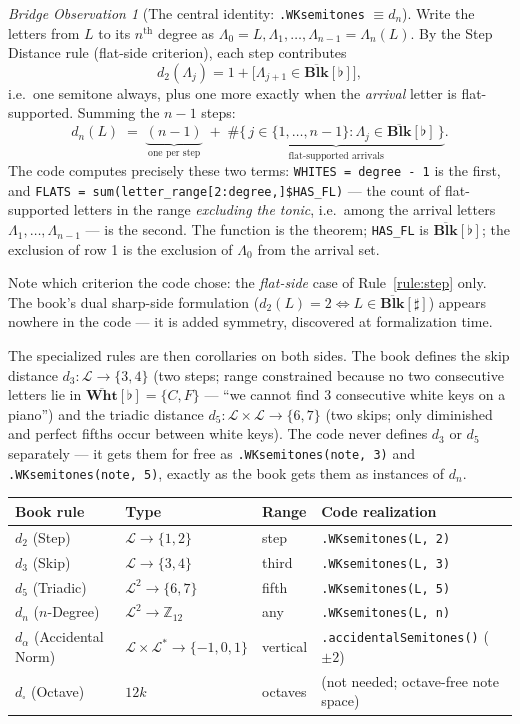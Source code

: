\documentclass[11pt]{article}
\newcommand{\MAlph}{\mathcal{L}}                 %
\newcommand{\Lstar}{\MAlph^{*}}                  %
\newcommand{\Lam}{\Lambda}                      %
\newcommand{\BL}{\overline{\textbf{Blk}}}       %
\newcommand{\WH}{\overline{\textbf{Wht}}}       %
\newcommand{\Ztwelve}{\mathbb{Z}_{12}}
\theoremstyle{definition}
\theoremstyle{remark}
\newtheorem{bridge}{Bridge Observation}[section]
\newcommand{\code}[1]{\texttt{#1}}
\begin{document}
\begin{bridge}[The central identity: \code{.WKsemitones} $\equiv d_n$]
\label{obs:central}
Write the letters from $L$ to its $n^{\text{th}}$ degree as
$\Lam_0 = L, \Lam_1, \dots, \Lam_{n-1} = \Lam_n(L)$. By the Step Distance rule
(flat-side criterion), each step contributes
$$d_2(\Lam_j) = 1 + \big[\Lam_{j+1} \in \BL[\flat]\big],$$
i.e.\ one semitone always, plus one more exactly when the \emph{arrival} letter
is flat-supported. Summing the $n-1$ steps:
$$d_n(L) \;=\; \underbrace{(n-1)}_{\text{one per step}}
\;+\; \underbrace{\#\{\, j \in \{1,\dots,n-1\} : \Lam_j \in \BL[\flat] \,\}}_{\text{flat-supported arrivals}}.$$
The code computes precisely these two terms:
\code{WHITES = degree - 1} is the first, and
\code{FLATS = sum(letter\_range[2:degree,]\$HAS\_FL)} --- the count of
flat-supported letters in the range \emph{excluding the tonic}, i.e.\ among the
arrival letters $\Lam_1, \dots, \Lam_{n-1}$ --- is the second. The function is
the theorem; \code{HAS\_FL} is $\BL[\flat]$; the exclusion of row 1 is the
exclusion of $\Lam_0$ from the arrival set.

Note which criterion the code chose: the \emph{flat-side} case of
Rule~\ref{rule:step} only. The book's dual sharp-side formulation
($d_2(L) = 2 \iff L \in \BL[\sharp]$) appears nowhere in the code --- it is
added symmetry, discovered at formalization time.
\end{bridge}

The specialized rules are then corollaries on both sides. The book defines the
skip distance $d_3 : \MAlph \to \{3, 4\}$ (two steps; range constrained because
no two consecutive letters lie in $\WH[\flat] = \{C, F\}$ --- ``we cannot find 3
consecutive white keys on a piano'') and the triadic distance
$d_5 : \MAlph \times \MAlph \to \{6, 7\}$ (two skips; only diminished and perfect
fifths occur between white keys). The code never defines $d_3$ or $d_5$
separately --- it gets them for free as \code{.WKsemitones(note, 3)} and
\code{.WKsemitones(note, 5)}, exactly as the book gets them as instances of
$d_n$.

\begin{center}
\renewcommand{\arraystretch}{1.3}
\begin{tabular}{@{}llll@{}}
\toprule
\textbf{Book rule} & \textbf{Type} & \textbf{Range} & \textbf{Code realization} \\
\midrule
$d_2$ (Step) & $\MAlph \to \{1,2\}$ & step & \code{.WKsemitones(L, 2)} \\
$d_3$ (Skip) & $\MAlph \to \{3,4\}$ & third & \code{.WKsemitones(L, 3)} \\
$d_5$ (Triadic) & $\MAlph^2 \to \{6,7\}$ & fifth & \code{.WKsemitones(L, 5)} \\
$d_n$ ($n$-Degree) & $\MAlph^2 \to \Ztwelve$ & any & \code{.WKsemitones(L, n)} \\
$d_{\alpha}$ (Accidental Norm) & $\MAlph \times \Lstar \to \{-1,0,1\}$ & vertical & \code{.accidentalSemitones()} ($\pm 2$) \\
$d_{\square}$ (Octave) & $12k$ & octaves & (not needed; octave-free note space) \\
\bottomrule
\end{tabular}
\end{center}
\end{document}
